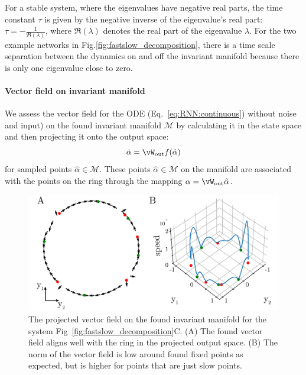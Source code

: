 \documentclass{article} %
\newcounter{ct}
\newcommand{\wout}{\vW_{\text{out}}}
\newcommand{\manifold}{\mathcal{M}}
\theoremstyle{definition}
\theoremstyle{remark}
\begin{document}

For a stable system, where the eigenvalues have negative real parts, the time constant \(\tau\) is given by the negative inverse of the eigenvalue's real part: \(\tau = -\frac{1}{\Re(\lambda)}\),
where \(\Re(\lambda)\) denotes the real part of the eigenvalue \(\lambda\).
For the two example networks in Fig.\ref{fig:fastslow_decomposition}, there is a time scale separation between the dynamics on and off the invariant manifold because there is only one eigenvalue close to zero.

 \paragraph{Vector field on invariant manifold}\label{sec:supp:vf}

 We assess the vector field for the ODE (Eq.~\ref{eq:RNN:continuous}) without noise and input) on the found invariant manifold \(\manifold\) by calculating it in the state space
 and then projecting it onto the output space:
 \begin{equation}
\dot \alpha =  \wout f(\hat \alpha) %
\end{equation}for sampled points \(\hat \alpha\in \manifold\).
These points \(\hat \alpha\in \manifold\) on the manifold are associated with the points on the ring through the mapping \(\alpha = \wout\hat\alpha\).


 \begin{figure}[tbhp]
     \centering
    \includegraphics[width=\textwidth]{vf_on_ring}
       \caption{The projected vector field on the found invariant manifold for the system Fig~\ref{fig:fastslow_decomposition}C.
       (A) The found vector field aligns well with the ring in the projected output space.
       (B) The norm of the vector field is low around found fixed points as expected, but is higher for points that are just slow points.
       }\label{fig:vf_on_ring}
\end{figure}
\end{document}
